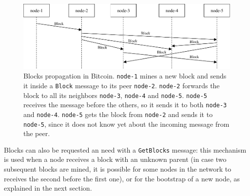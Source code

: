 \begin{figure}[ht]
	\centering
	\vspace*{0.4cm}
	\includegraphics[scale=1.04]{figures/block_propagation}
	\vspace*{0.25cm}
	\caption[Blocks propagation in Bitcoin]{
		Blocks propagation in Bitcoin.
		\texttt{node-1} mines a new block and sends it inside a \texttt{Block} message to its peer \texttt{node-2}.
		\texttt{node-2} forwards the block to all its neighbors \texttt{node-3}, \texttt{node-4} and \texttt{node-5}.
		\texttt{node-5} receives the message before the others, so it sends it to both \texttt{node-3} and \texttt{node-4}.
		\texttt{node-5} gets the block from \texttt{node-2} and sends it to \texttt{node-5}, since it does not know yet about the incoming message from the peer.
	}
	\label{fig:block-propagation}
\end{figure}

\bigskip
Blocks can also be requested an need with a \texttt{GetBlocks} message:
this mechanism is used when a node receives a block with an unknown parent (in case two subsequent blocks are mined, it is possible for some nodes in the network to receives the second before the first one), or for the bootstrap of a new node, as explained in the next section.

